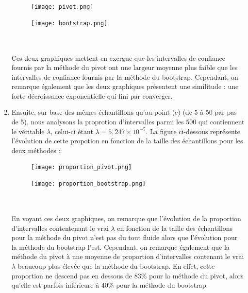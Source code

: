 \documentclass[a4paper, 11pt]{article}
\begin{document}
\begin{enumerate}[label=(\alph*)]
    \begin{figure}[h!]
    \begin{minipage}{.5\textwidth}
        \centering
        \texttt{[image: pivot.png]}
        \caption{}
        \label{Débit_frottement}
    \end{minipage}
    \hspace{0.55cm}
    \begin{minipage}{.5\textwidth}
        \centering
        \texttt{[image: bootstrap.png]}
        \caption{}
        \label{Pression_frottement}
    \end{minipage}
\end{figure}\\\\
Ces deux graphiques mettent en exergue que les intervalles de confiance fournis par la méthode du pivot ont une largeur moyenne plus faible que les intervalles de confiance fournis par la méthode du bootstrap. Cependant, on remarque également que les deux graphiques présentent une similitude : une forte décroissance exponentielle qui fini par converger.
    \item Ensuite, sur base des mêmes échantillons qu'au point (e) (de 5 à 50 par pas de 5), nous analysons la proprotion d'intervalles parmi les 500 qui contiennent le véritable $\lambda$, celui-ci étant $\lambda=5,247\times10^{-5}$. La figure ci-dessous représente l'évolution de cette propotion en fonction de la taille des échantillons pour les deux méthodes :
        \begin{figure}[h!]
    \begin{minipage}{.5\textwidth}
        \centering
        \texttt{[image: proportion\_pivot.png]}
        \caption{}
        \label{Débit_frottement}
    \end{minipage}
    \hspace{0.55cm}
    \begin{minipage}{.5\textwidth}
        \centering
        \texttt{[image: proportion\_bootstrap.png]}
        \caption{}
        \label{Pression_frottement}
    \end{minipage}
\end{figure}\\\\
En voyant ces deux graphiques, on remarque que l'évolution de la proportion d'intervalles contentenant le vrai $\lambda$ en fonction de la taille des échantillons pour la méthode du pivot n'est pas du tout fluide alors que l'évolution pour la méthode du bootstrap l'est. Cependant, on remarque également que la méthode du pivot à une moyenne de proportion d'intervalles contenant le vrai $\lambda$ beaucoup plus élevée que la méthode du bootstrap. En effet, cette proportion ne descend pas en dessous de $83\%$ pour la méthode du pivot, alors qu'elle est parfois inférieure à $40\%$ pour la méthode du bootstrap.

\end{enumerate}
\end{document}

